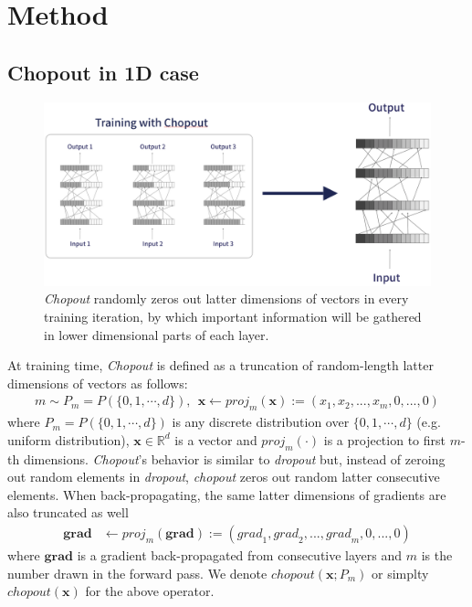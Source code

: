 \documentclass{article}
\begin{document}
    \section{Method}
    \label{sec:method}
    
    \subsection{Chopout in 1D case}
    \label{subsec:chopout-1d}
    
    \begin{figure}[tbp]
    \includegraphics[width=0.7\hsize]{chopout.png}
    \caption{\textit{Chopout} randomly zeros out latter dimensions of vectors in every training iteration, by which important information will be gathered in lower dimensional parts of each layer.}
    \label{chopout}
    \end{figure}
    
    At training time, \textit{Chopout} is defined as a truncation of random-length latter dimensions of vectors as follows:
    \begin{align}
        m \sim P_m = P(\{0, 1, \cdots, d\}), \ \ 
        \mathbf{x} \leftarrow {proj}_m(\mathbf{x}) := (x_1, x_2, ..., x_m, 0, ..., 0) \nonumber
    \end{align}
    where $P_m = P(\{0, 1, \cdots, d\})$ is any discrete distribution over $\{0, 1, \cdots, d\}$ (e.g. uniform distribution), $\mathbf{x} \in \mathbb{R}^d$ is a vector and ${proj}_m(\cdot)$ is a projection to first $m$-th dimensions. 
    \textit{Chopout}'s behavior is similar to \textit{dropout} but, instead of zeroing out random elements in \textit{dropout}, \textit{chopout} zeros out random latter consecutive elements. When back-propagating, the same latter dimensions of gradients are also truncated as well
    \begin{align}
        \mathbf{grad} &\leftarrow {proj}_m(\mathbf{grad}) := ({grad}_1, {grad}_2, ..., {grad}_m, 0, ..., 0) \nonumber
    \end{align}    
    where $\mathbf{grad}$ is a gradient back-propagated from consecutive layers and $m$ is the number drawn in the forward pass. We denote $chopout(\mathbf{x}; P_m)$ or simplty $chopout(\mathbf{x})$ for the above operator.
    
\end{document}
